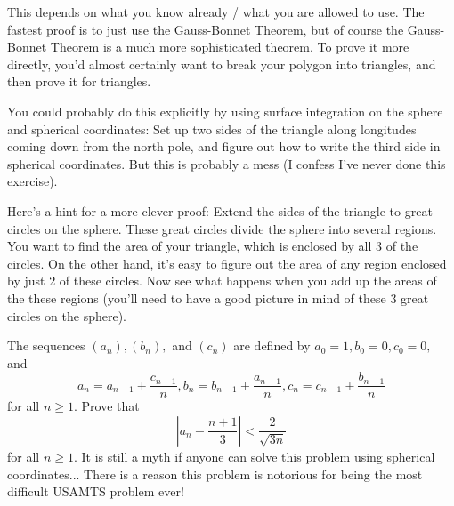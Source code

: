 \begin{solution}[name={Solution by Yenlee}]
	This depends on what you know already / what you are allowed to use. The fastest proof is to just use the Gauss-Bonnet Theorem, but of course the Gauss-Bonnet Theorem is a much more sophisticated theorem. To prove it more directly, you'd almost certainly want to break your polygon into triangles, and then prove it for triangles.
	
	You could probably do this explicitly by using surface integration on the sphere and spherical coordinates: Set up two sides of the triangle along longitudes coming down from the north pole, and figure out how to write the third side in spherical coordinates. But this is probably a mess (I confess I've never done this exercise). 
	
	Here's a hint for a more clever proof: Extend the sides of the triangle to great circles on the sphere. These great circles divide the sphere into several regions. You want to find the area of your triangle, which is enclosed by all 3 of the circles. On the other hand, it's easy to figure out the area of any region enclosed by just 2 of these circles. Now see what happens when you add up the areas of the these regions (you'll need to have a good picture in mind of these 3 great circles on the sphere).
\end{solution}




\begin{question}[name={2010 USAMTS Round III}]
	The sequences $(a_n), (b_n),$ and $(c_n)$ are defined by $a_0 = 1, b_0 = 0, c_0 = 0,$ and
	\[a_n = a_{n-1} +
	\frac{c_{n-1}}{n},  b_n = b_{n-1} +\frac{a_{n-1}}{n}, c_n = c_{n-1} +\frac{b_{n-1}}{n}\]
	for all $n \geq1$. Prove that
	\[\left|a_n -\frac{n + 1}{3}\right|<\frac{2}{\sqrt{3n}}\]
	for all $n \geq 1$. It is still a myth if anyone can solve this problem using spherical coordinates... There is a reason this problem is notorious for being the most difficult USAMTS problem ever!
\end{question}


